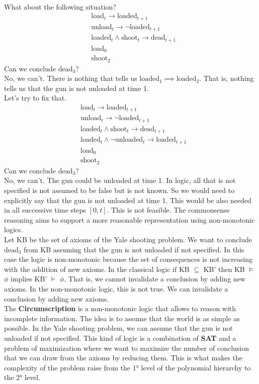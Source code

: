 \\
What about the following situation?
\begin{align*}
    &\text{load}_t\to \text{loaded}_{t+1}\\
    &\text{unload}_t\to \neg \text{loaded}_{t+1}\\
    &\text{loaded}_t\land \text{shoot}_t\to \text{dead}_{t+1}\\
    &\text{load}_0 \\
    &\text{shoot}_2
\end{align*}
Can we conclude $\text{dead}_3$?\\
No, we can't. There is nothing that tells us $\text{loaded}_1 \implies \text{loaded}_2$. That is, nothing tells us that the gun is not unloaded at time 1.\\
Let's try to fix that. 
\begin{align*}
    &\text{load}_t\to \text{loaded}_{t+1}\\
    &\text{unload}_t\to \neg \text{loaded}_{t+1}\\
    &\text{loaded}_t\land \text{shoot}_t\to \text{dead}_{t+1}\\
    &\text{loaded}_t\land\neg\text{unloaded}_t\to \text{loaded}_{t+1}\\
    &\text{load}_0 \\
    &\text{shoot}_2
\end{align*}
Can we conclude $\text{dead}_3$?\\
No, we can't. The gun could be unloaded at time 1. In logic, all that is not specified is not assumed to be false but is not known. So we would need to explicitly say that the gun is not unloaded at time 1. This would be also needed in all successive time steps $[0,t]$. This is not feasible. The commonsense reasoning aims to support a more reasonable representation using non-monotonic logics.\\
Let KB be the set of axioms of the Yale shooting problem. We want to conclude $\text{dead}_3$ from KB assuming that the gun is not unloaded if not specified. In this case the logic is non-monotonic because the set of consequences is not increasing with the addition of new axioms. In the classical logic if KB $\subseteq$ KB' then KB $\vDash$ $\phi$ implies KB' $\vDash$ $\phi$. That is, we cannot invalidate a conclusion by adding new axioms. In the non-monotonic logic, this is not true. We can invalidate a conclusion by adding new axioms.\\
The \textbf{Circumscription} is a non-monotonic logic that allows to reason with incomplete information. The idea is to assume that the world is as simple as possible. In the Yale shooting problem, we can assume that the gun is not unloaded if not specified. This kind of logic is a combination of \textbf{SAT} and a problem of maximization where we want to maximize the number of conclusion that we can draw from the axioms by reducing them. This is what makes the complexity of the problem raise from the 1° level of the polynomial hierarchy to the 2° level.\\

